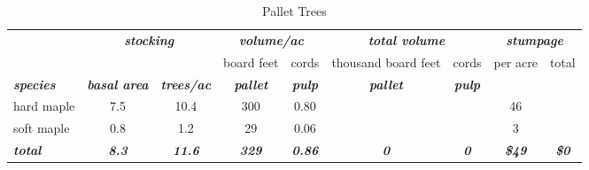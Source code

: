 \documentclass[landscape]{article}
\begin{document}
\begin{table}[H]

\caption{\label{tab:unnamed-chunk-20}Pallet Trees}
\fontsize{10}{12}\selectfont
\begin{tabular}[t]{lcccccccc}
\toprule
\multicolumn{1}{c}{\em{\textbf{ }}} & \multicolumn{2}{c}{\em{\textbf{stocking}}} & \multicolumn{2}{c}{\em{\textbf{volume/ac }}} & \multicolumn{2}{c}{\em{\textbf{total volume}}} & \multicolumn{2}{c}{\em{\textbf{stumpage}}} \\
\cmidrule(l{3pt}r{3pt}){2-3} \cmidrule(l{3pt}r{3pt}){4-5} \cmidrule(l{3pt}r{3pt}){6-7} \cmidrule(l{3pt}r{3pt}){8-9}
\multicolumn{3}{c}{ } & \multicolumn{1}{c}{board feet} & \multicolumn{1}{c}{cords} & \multicolumn{1}{c}{thousand board feet} & \multicolumn{1}{c}{cords} & \multicolumn{1}{c}{per acre} & \multicolumn{1}{c}{total} \\
\cmidrule(l{3pt}r{3pt}){4-4} \cmidrule(l{3pt}r{3pt}){5-5} \cmidrule(l{3pt}r{3pt}){6-6} \cmidrule(l{3pt}r{3pt}){7-7} \cmidrule(l{3pt}r{3pt}){8-8} \cmidrule(l{3pt}r{3pt}){9-9}
\rowcolor[HTML]{DCDCDC}  \em{\textbf{species}} & \em{\textbf{basal area}} & \em{\textbf{trees/ac}} & \em{\textbf{pallet}} & \em{\textbf{pulp}} & \em{\textbf{pallet}} & \em{\textbf{pulp}} & \em{\textbf{ }} & \em{\textbf{ }}\\
\midrule
\rowcolor{gray!6}  hard maple & 7.5 & 10.4 & 300 & 0.80 &  &  & 46 & \\
 
soft maple & 0.8 & 1.2 & 29 & 0.06 &  &  & 3 & \\
 
\rowcolor{gray!6}  \rowcolor[HTML]{DCDCDC}  \em{\textbf{total}} & \em{\textbf{8.3}} & \em{\textbf{11.6}} & \em{\textbf{329}} & \em{\textbf{0.86}} & \em{\textbf{0}} & \em{\textbf{0}} & \em{\textbf{\$49}} & \em{\textbf{\$0}}\\
\bottomrule
\end{tabular}
\end{table}
\end{document}
